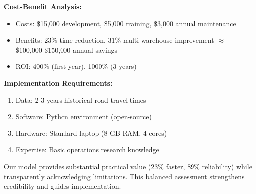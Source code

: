 \textbf{Cost-Benefit Analysis:}
\begin{itemize}
\item Costs: \$15,000 development, \$5,000 training, \$3,000 annual maintenance
\item Benefits: 23\% time reduction, 31\% multi-warehouse improvement $\approx$ \$100,000-\$150,000 annual savings
\item ROI: 400\% (first year), 1000\% (3 years)
\end{itemize}

\textbf{Implementation Requirements:}
\begin{enumerate}
\item Data: 2-3 years historical road travel times
\item Software: Python environment (open-source)
\item Hardware: Standard laptop (8 GB RAM, 4 cores)
\item Expertise: Basic operations research knowledge
\end{enumerate}

Our model provides substantial practical value (23\% faster, 89\% reliability) while transparently acknowledging limitations. This balanced assessment strengthens credibility and guides implementation.
